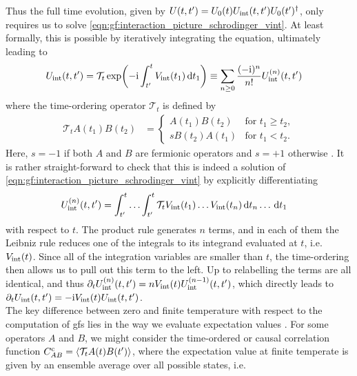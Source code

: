 Thus the full time evolution, given by $U(t,t') = U_0(t) U_\tint(t,t') U_0(t')^\dagger$, only requires us to solve \autoref{eqn:gf:interaction_picture_schrodinger_vint}.
At least formally, this is possible by iteratively integrating the equation, ultimately leading to \cite[]{QMB_Bruus_2004}
\begin{align*}
U_\tint(t,t') &= \mathcal{T}_t \exp \kla*{-\i \intx{t'}{t}{V_\tint(t_1)}{t_1}} \equiv \sum_{n\ge 0} \frac{(-\i)^n}{n!} U_\tint^{(n)}(t,t')
\end{align*}
where the time-ordering operator $\mathcal{T}_t$ is defined by
\begin{align}
\mathcal{T}_t A(t_1) B(t_2) &= \begin{cases} A(t_1) B(t_2) & \text{for } t_1\ge t_2,\\ sB(t_2) A(t_1) & \text{for } t_1<t_2. \end{cases} \label{eqn:gf:time_order_def}
\end{align}
Here, $s=-1$ if both $A$ and $B$ are fermionic operators and $s=+1$ otherwise \cites[]{QMB_Fabrizio_2022}. %
It is rather straight-forward to check that this is indeed a solution of \autoref{eqn:gf:interaction_picture_schrodinger_vint} by explicitly differentiating
\begin{align*}
U_\tint^{(n)}(t,t') &= \intx{t'}{t}{\dots \intx{t'}{t}{ \mathcal{T}_t V_\tint(t_1) \dots V_\tint(t_n)}{t_n} \dots }{t_1}
\end{align*}
with respect to $t$.
The product rule generates $n$ terms, and in each of them the Leibniz rule reduces one of the integrals to its integrand evaluated at $t$, i.e. $V_\tint(t)$.
Since all of the integration variables are smaller than $t$, the time-ordering then allows us to pull out this term to the left.
Up to relabelling the terms are all identical, and thus $\partial_t U_\tint^{(n)}(t,t') = n V_\tint(t) U_\tint^{(n-1)}(t,t')$, which directly leads to $\partial_{t} U_\tint(t,t') = -\i V_\tint(t) U_\tint(t,t')$.\\
The key difference between zero and finite temperature with respect to the computation of \glspl{gf} lies in the way we evaluate expectation values \cite{QMB_Mahan_2000}.
For some operators $A$ and $B$, we might consider the time-ordered or causal correlation function $C^\c_{AB} = \bra*{\mathcal{T}_t A(t) B(t')}$, where the expectation value at finite temperate is given by an ensemble average over all possible states, i.e.
